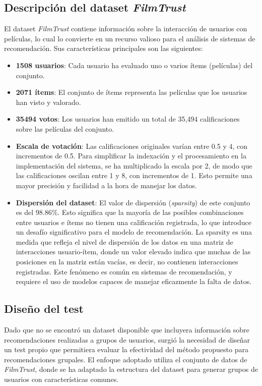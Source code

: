 \documentclass[runningheads,a4paper]{llncs}
\begin{document}
 \subsection{Descripción del dataset \textit{FilmTrust}}

 El dataset \textit{FilmTrust} contiene información 
 sobre la interacción de usuarios con películas, 
 lo cual lo convierte en un recurso valioso para el 
 análisis de sistemas de recomendación. 
 Sus características principales son las siguientes:
 \begin{itemize}
    \item \textbf{1508 usuarios}: Cada usuario ha 
    evaluado uno o varios ítems (películas) del conjunto.
    \item \textbf{2071 ítems}: El conjunto de ítems representa las películas que los usuarios han visto y valorado.
    \item \textbf{35494 votos}: Los usuarios han emitido un total de 35,494 calificaciones sobre las películas del conjunto.
    \item \textbf{Escala de votación}: Las calificaciones originales varían entre 0.5 y 4, con incrementos de 0.5. Para simplificar la indexación y el procesamiento en la implementación del sistema, se ha multiplicado la escala por 2, de modo que las calificaciones oscilan entre 1 y 8, con incrementos de 1. Esto permite una mayor precisión y facilidad a la hora de manejar los datos.
    \item \textbf{Dispersión del dataset}: El valor de dispersión (\textit{sparsity}) de este conjunto es del 98.86\%. Esto significa que la mayoría de las posibles combinaciones entre usuarios e ítems no tienen una calificación registrada, lo que introduce un desafío significativo para el modelo de recomendación. La sparsity es una medida que refleja el nivel de dispersión de los datos en una matriz de interacciones usuario-ítem, donde un valor elevado indica que muchas de las posiciones en la matriz están vacías, es decir, no contienen interacciones registradas. Este fenómeno es común en sistemas de recomendación, y requiere el uso de modelos capaces de manejar eficazmente la falta de datos.
 \end{itemize}

 \subsection{Diseño del test}
 Dado que no se encontró un dataset disponible que incluyera información sobre recomendaciones realizadas a grupos de usuarios, surgió la necesidad de diseñar un test propio que permitiera evaluar la efectividad del método propuesto para recomendaciones grupales. El enfoque adoptado utiliza el conjunto de datos de \textit{FilmTrust}, donde se ha adaptado la estructura del dataset para generar grupos de usuarios con características comunes.
\end{document}
